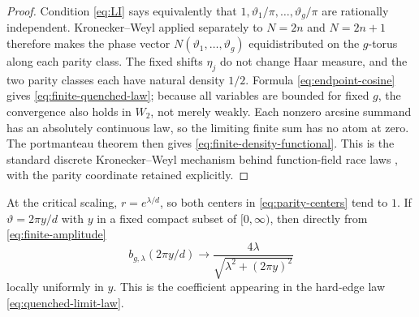 \begin{proof}
Condition \eqref{eq:LI} says equivalently that
\(1,\vartheta_1/\pi,\ldots,\vartheta_g/\pi\) are rationally independent.
Kronecker--Weyl applied separately to \(N=2n\) and \(N=2n+1\) therefore
makes the phase vector \(N(\vartheta_1,\ldots,\vartheta_g)\) equidistributed
on the \(g\)-torus along each parity class.  The fixed shifts \(\eta_j\) do
not change Haar measure, and the two parity classes each have natural density
\(1/2\).  Formula \eqref{eq:endpoint-cosine} gives
\eqref{eq:finite-quenched-law}; because all variables are bounded for fixed
\(g\), the convergence also holds in \(W_2\), not merely weakly.  Each
nonzero arcsine summand has an absolutely continuous law, so the limiting
finite sum has no atom at zero.  The portmanteau theorem then gives
\eqref{eq:finite-density-functional}.  This is the standard discrete
Kronecker--Weyl mechanism behind function-field race laws
\cite{Cha2008,Bailleul2022}, with the parity coordinate retained explicitly.
\end{proof}

At the critical scaling, \(r=e^{\lambda/d}\), so both centers in
\eqref{eq:parity-centers} tend to \(1\).  If
\(\vartheta=2\pi y/d\) with \(y\) in a fixed compact subset of
\([0,\infty)\), then directly from \eqref{eq:finite-amplitude}
\begin{equation}
 b_{g,\lambda}(2\pi y/d)
 \longrightarrow
 \frac{4\lambda}{\sqrt{\lambda^2+(2\pi y)^2}}
\label{eq:critical-amplitude-limit}
\end{equation}
locally uniformly in \(y\).  This is the coefficient appearing in the
hard-edge law \eqref{eq:quenched-limit-law}.

